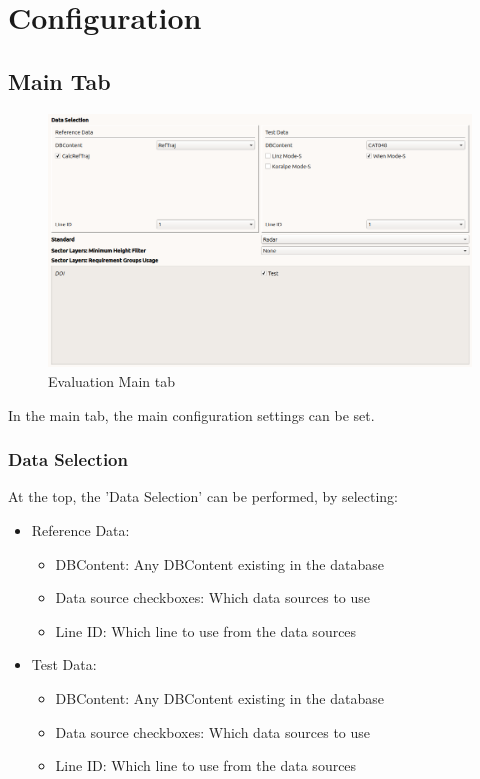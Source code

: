 \section{Configuration}
\label{sec:eval_config} 

\subsection{Main Tab}

\begin{figure}[H]
  \hspace*{-2cm}
    \includegraphics[width=18cm,frame]{figures/eval_main.png}
  \caption{Evaluation Main tab}
\end{figure}

In the main tab, the main configuration settings can be set. \\

\subsubsection{Data Selection}

At the top, the 'Data Selection' can be performed, by selecting:
\begin{itemize}  
\item Reference Data:
\begin{itemize}  
\item DBContent: Any DBContent existing in the database
\item Data source checkboxes: Which data sources to use
\item Line ID: Which line to use from the data sources
\end{itemize}
\item Test Data:
\begin{itemize}  
\item DBContent: Any DBContent existing in the database
\item Data source checkboxes: Which data sources to use
\item Line ID: Which line to use from the data sources
\end{itemize}
\end{itemize}
\ \\

